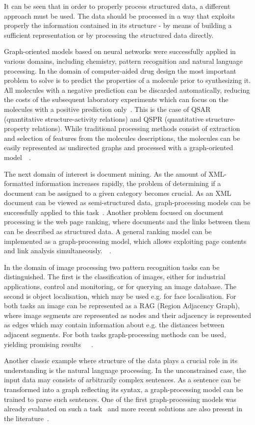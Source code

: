 It can be seen that in order to properly process structured data, a different approach must be used. The data should be processed in a way that exploits properly the information contained in its structure - by means of building a sufficient representation or by processing the structured data directly. 

Graph-oriented models based on neural networks were successfully applied in various domains, including chemistry, pattern recognition and natural language processing. In the domain of computer-aided drug design the most important problem to solve is to predict the properties of a molecule prior to synthesizing it. All molecules with a negative prediction can be discarded automatically, reducing the costs of the subsequent laboratory experiments which can focus on the molecules with a positive prediction only~\cite{goulon2005hopfield}. This is the case of QSAR (quantitative structure-activity relations) and QSPR (quantitative structure-property relations). While traditional processing methods consist of extraction and selection of features from the molecules descriptions, the molecules can be easily represented as undirected graphs and processed with a graph-oriented model~\cite{goulon2007predicting}~\cite{goulon2005learning}.

The next domain of interest is document mining. As the amount of XML-formatted information increases rapidly, the problem of determining if a document can be assigned to a given category becomes crucial. As an XML document can be viewed as semi-structured data, graph-processing models can be successfully applied to this task~\cite{yong2006xml}. Another problem focused on document processing is the web page ranking, where documents and the links between them can be described as structured data. A general ranking model can be implemented as a graph-processing model, which allows exploiting page contents and link analysis simultaneously.~\cite{scarselli2005graph}~\cite{scarselli2009graph}.

In the domain of image processing two pattern recognition tasks can be distinguished. The first is the classification of images, either for industrial applications, control and monitoring, or for querying an image database. The second is object localisation, which may be used e.g. for face localisation. For both tasks an image can be represented as a RAG (Region Adjacency Graph), where image segments are represented as nodes and their adjacency is represented as edges which may contain information about e.g. the distances between adjacent segments. For both tasks graph-processing methods can be used, yielding promising results~\cite{monfardini2006graph}~\cite{bianchini2005recursive}~\cite{quek2011structural}.

Another classic example where structure of the data plays a crucial role in its understanding is the natural language processing. In the unconstrained case, the input data may consists of arbitrarily complex sentences. As a sentence can be transformed into a graph reflecting its syntax, a graph-processing model can be trained to parse such sentences. One of the first graph-processing models was already evaluated on such a task~\cite{pollack1990recursive} and more recent solutions are also present in the literature~\cite{costa2003towards}. 
